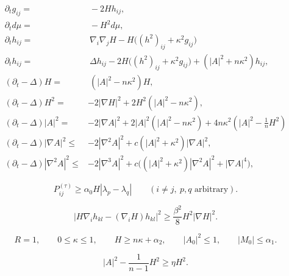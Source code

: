 \documentclass[10pt,a4paper]{amsart}
\begin{document}
\begin{align}
 \partial_tg_{ij}=&~-2Hh_{ij},\nonumber\\
 \partial_t d\mu=&~-H^2d\mu, \label{s2.evl-dmu}\\
    \partial_th_{ij}
 =&~\nabla_i\nabla_jH-H\bigl((h^2)_{ij}+\kappa^2g_{ij}\bigr)\nonumber\\
 \partial_th_{ij}  =&~\Delta h_{ij}-2H\bigl((h^2)_{ij}+\kappa^2g_{ij}\bigr)
  +(|A|^2+n\kappa^2)h_{ij},\label{eq:h-direct-evolution}\\
 (\partial_t-\Delta)H=&~(|A|^2-n\kappa^2)H,\label{eq:H-evol}\\
 (\partial_t-\Delta)H^2=&-2|\nabla H|^2
   +2H^2(|A|^2-n\kappa^2),\label{eq:H2-evol}\\
 (\partial_t-\Delta)|A|^2=&-2|\nabla A|^2
   +2|A|^2(|A|^2-n\kappa^2)
   +4n\kappa^2\left(|A|^2-\frac1nH^2\right)\label{eq:A2-evol}\\
 (\partial_t-\Delta)|\nabla A|^2
 \leq&-2|\nabla^2A|^2+c(|A|^2+\kappa^2)|\nabla A|^2,\label{eq:derivative-evolutions}\\
 (\partial_t-\Delta)|\nabla^2A|^2
 \leq&-2|\nabla^3A|^2
 +c\bigl((|A|^2+\kappa^2)|\nabla^2A|^2+|\nabla A|^4\bigr), \label{eq:derivative-evolutions-2}
\end{align}

\begin{equation}\label{eq:uniform-taubiric}
 P_{ij}^{(\tau)}
 \geq\alpha_0 H|\lambda_p-\lambda_q|
 \qquad(i\ne j,\ p,q\text{ arbitrary}).
\end{equation}

\begin{equation}\label{eq:kato-hs}
 |H\nabla_i h_{kl}-(\nabla_iH)h_{kl}|^2
 \geq\frac{\beta^2}{8}H^2|\nabla H|^2.
\end{equation}

\begin{equation}\label{eq:normalized-space-form-setting}
 R=1,\qquad
 0\leq\kappa\leq1,\qquad
 H\geq n\kappa+\alpha_2,\qquad
 |A_0|^2\leq1,\qquad
 |M_0|\leq\alpha_1.
\end{equation}

\begin{equation}\label{eq:acylindrical-region}
 |A|^2-\frac1{n-1}H^2\geq\eta H^2.
\end{equation}
\end{document}
